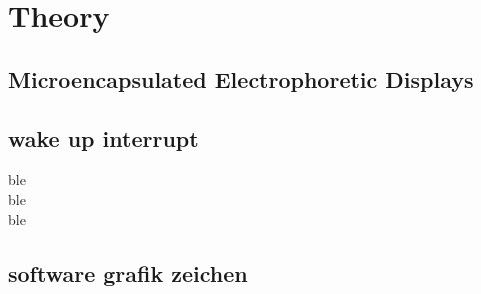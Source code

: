 \chapter{Theory}

\section{Microencapsulated Electrophoretic Displays}


\section{wake up interrupt}
\acf{ble}\\
\acs{ble}\\
\acl{ble}

\section{software grafik zeichen}
